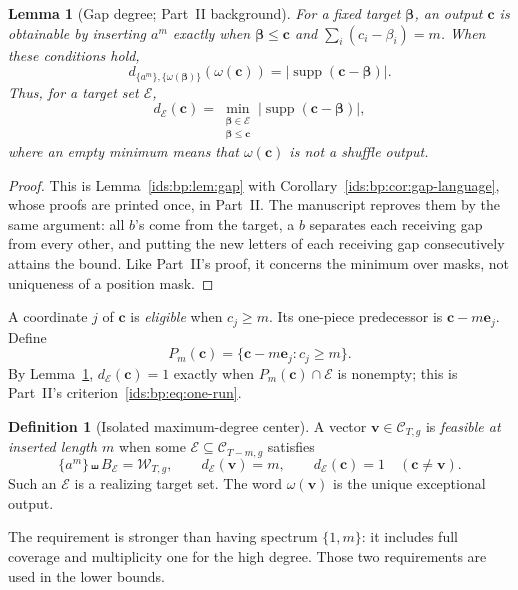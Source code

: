 \documentclass[11pt,letterpaper]{article}
\newtheorem{lemma}[theorem]{Lemma}
\theoremstyle{definition}\newtheorem{definition}[theorem]{Definition}
\theoremstyle{remark}\newtheorem{remark}[theorem]{Remark}
\theoremstyle{definition}\newtheorem{question}[theorem]{Question}
\newcommand{\sh}{\mathbin{\shuffle}}
\DeclareMathOperator{\supp}{supp}
\newcommand{\bpgap}[1]{\omega(#1)}
\newcommand{\bpC}[2]{\mathcal C_{#1,#2}}
\newcommand{\bpW}[2]{\mathcal W_{#1,#2}}
\newcommand{\bpE}{\mathcal E}
\begin{document}
\begin{lemma}[Gap degree; Part~II background]\label{ids:si:lem:gap}
For a fixed target $\boldsymbol\beta$, an output $\mathbf c$ is obtainable by inserting
$a^m$ exactly when $\boldsymbol\beta\leq\mathbf c$ and $\sum_i(c_i-\beta_i)=m$.
When these conditions hold,
\begin{equation}\label{ids:si:eq:gapdegree}
 d_{\{a^m\},\{\bpgap{\boldsymbol\beta}\}}(\bpgap{\mathbf c})
   =|\supp(\mathbf c-\boldsymbol\beta)|.
\end{equation}
Thus, for a target set $\bpE$,
\begin{equation}\label{ids:si:eq:mindegree}
 d_{\bpE}(\mathbf c)=\min_{\substack{\boldsymbol\beta\in \bpE\\\boldsymbol\beta\leq\mathbf c}}
             |\supp(\mathbf c-\boldsymbol\beta)|,
\end{equation}
where an empty minimum means that $\bpgap{\mathbf c}$ is not a shuffle output.
\end{lemma}
\begin{proof}
This is Lemma~\ref{ids:bp:lem:gap} with
Corollary~\ref{ids:bp:cor:gap-language}, whose proofs are printed once, in
Part~II. The manuscript reproves them by the same argument: all $b$'s come
from the target, a $b$ separates each receiving gap from every other, and
putting the new letters of each receiving gap consecutively attains the
bound. Like Part~II's proof, it concerns the minimum over masks, not
uniqueness of a position mask.
\end{proof}

A coordinate $j$ of $\mathbf c$ is \emph{eligible} when $c_j\geq m$.
Its one-piece predecessor is $\mathbf c-m\mathbf e_j$. Define
\begin{equation}\label{ids:si:eq:pred}
 P_m(\mathbf c)=\{\mathbf c-m\mathbf e_j:c_j\geq m\}.
\end{equation}
By Lemma~\ref{ids:si:lem:gap}, $d_{\bpE}(\mathbf c)=1$ exactly when
$P_m(\mathbf c)\cap \bpE$ is nonempty; this is Part~II's
criterion~\eqref{ids:bp:eq:one-run}.

\begin{definition}[Isolated maximum-degree center]\label{ids:si:def:center}
A vector $\mathbf v\in\bpC{T}{g}$ is \emph{feasible at inserted length $m$}
when some $\bpE\subseteq\bpC{T-m}{g}$ satisfies
\begin{equation}\label{ids:si:eq:isolation}
 \{a^m\}\sh B_{\bpE}=\bpW{T}{g},\qquad
 d_{\bpE}(\mathbf v)=m,\qquad d_{\bpE}(\mathbf c)=1\quad(\mathbf c\ne\mathbf v).
\end{equation}
Such an $\bpE$ is a realizing target set. The word $\bpgap{\mathbf v}$ is the
unique exceptional output.
\end{definition}
The requirement is stronger than having spectrum $\{1,m\}$: it includes
full coverage and multiplicity one for the high degree. Those two
requirements are used in the lower bounds.
\end{document}
